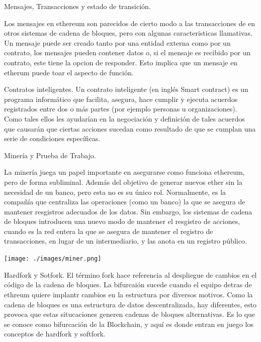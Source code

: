 \documentclass[usenames,dvipsnames]{beamer}
\begin{document}
\begin{frame}{ Mensajes, Transacciones y estado de transición. }

Los mensajes en ethereum son parecidos de cierto modo a las transacciones de en otros  sistemas de cadena de bloques, pero  con algunas caracteristicas llamativas. Un mensaje puede ser creado tanto por una entidad externa como por un contrato, los mensajes pueden contener datos o, si el mensaje es recibido por un contrato, este tiene la opcion de responder. Esto implica que un mensaje en etherum puede toar el aspecto de función.\\
\end{frame}


\begin{frame}{ Contratos inteligentes. }
Un contrato inteligente (en inglés Smart contract) es un programa informático que facilita, asegura, hace cumplir y ejecuta acuerdos registrados entre dos o más partes (por ejemplo personas u organizaciones). Como tales ellos les ayudarían en la negociación y definición de tales acuerdos que causarán que ciertas acciones sucedan como resultado de que se cumplan una serie de condiciones específicas.\\
\end{frame}

\begin{frame}{ Minería y Prueba de Trabajo. }
	
La minería juega un papel importante en asegurarse como funciona ethereum, pero de forma subliminal. Además del objetivo de generar nuevos ether sin la necesidad de un banco, pero esta no es su único rol. Normalmente, es la compañía que centraliza las operaciones (como un banco) la que se asegura de mantener resgistros adecuados de los datos. Sin embargo, los sistemas de cadena de bloques introducen una nuevo modo de mantener el resgistro de acciones, cuando es la red entera la que se asegura de mantener el registro de transacciones, en lugar de un intermediario, y las anota en un registro público.\\
\begin{center}
\hfill\texttt{[image: ./images/miner.png]}
\end{center}
\end{frame}

\begin{frame}{ Hardfork y Sotfork. }
El término fork hace referencia al despliegue de cambios en el código de la cadena de bloques. La bifurcaión sucede cuando el equipo detras de ethreum quiere implantr cambios en la estructura por diversos motivos. Como la cadena de bloques es una estructura de datos descentralizada, hay diferentes, esto provoca que estas situcaciones generen cadenas de bloques alternativas. Es lo que se conoce como bifurcación de la Blockchain, y aquí es donde entran en juego los conceptos de hardfork y softfork.\\
\end{frame}
\end{document}

